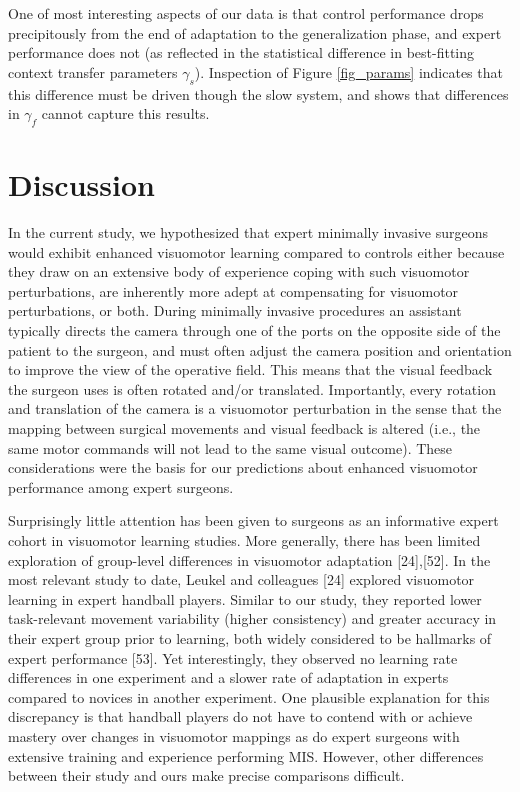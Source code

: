 \documentclass[jou, apacite, 11pt, longtable, floatsintext, notab]{apa6}
\begin{document}
One of most interesting aspects of our data is that control
performance drops precipitously from the end of adaptation
to the generalization phase, and expert performance does not
(as reflected in the statistical difference in best-fitting
context transfer parameters $\gamma_s$). Inspection of
Figure \ref{fig_params} indicates that this difference must
be driven though the slow system, and shows that differences
in $\gamma_f$ cannot capture this results.

\section{Discussion}
In the current study, we hypothesized that expert minimally
invasive surgeons would exhibit enhanced visuomotor learning
compared to controls either because they draw on an
extensive body of experience coping with such visuomotor
perturbations, are inherently more adept at compensating for
visuomotor perturbations, or both. During minimally invasive
procedures an assistant typically directs the camera through
one of the ports on the opposite side of the patient to the
surgeon, and must often adjust the camera position and
orientation to improve the view of the operative field. This
means that the visual feedback the surgeon uses is often
rotated and/or translated. Importantly, every rotation and
translation of the camera is a visuomotor perturbation in
the sense that the mapping between surgical movements and
visual feedback is altered (i.e., the same motor commands
will not lead to the same visual outcome). These
considerations were the basis for our predictions about
enhanced visuomotor performance among expert surgeons.

Surprisingly little attention has been given to surgeons as
an informative expert cohort in visuomotor learning studies. More generally, there has been limited exploration of
group-level differences in visuomotor adaptation [24],[52].
In the most relevant study to date, Leukel and colleagues
[24] explored visuomotor learning in expert handball
players. Similar to our study, they reported lower
task-relevant movement variability (higher consistency) and
greater accuracy in their expert group prior to learning,
both widely considered to be hallmarks of expert performance
[53]. Yet interestingly, they observed no learning rate
differences in one experiment and a slower rate of
adaptation in experts compared to novices in another
experiment. One plausible explanation for this discrepancy
is that handball players do not have to contend with or
achieve mastery over changes in visuomotor mappings as do
expert surgeons with extensive training and experience
performing MIS. However, other differences between their
study and ours make precise comparisons difficult.
\end{document}

